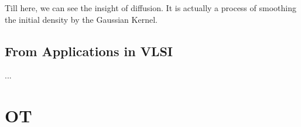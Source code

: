 \documentclass{article}
\begin{document}
Till here, we can see the insight of diffusion. It is actually a process of smoothing the initial density by the Gaussian Kernel.

\subsection{From Applications in VLSI}
...

\section{OT}
\end{document}
